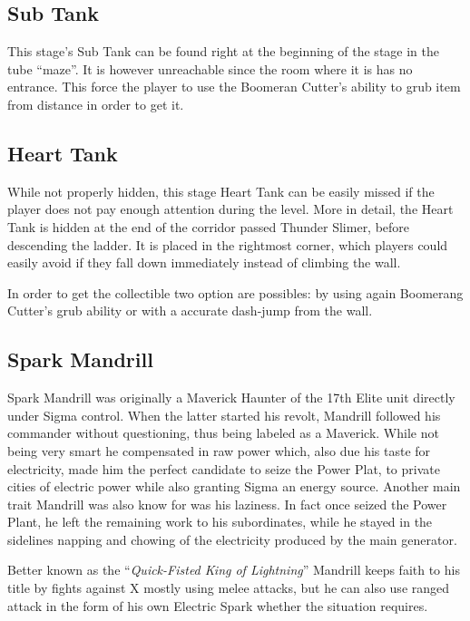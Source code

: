  


\subsection{Sub Tank}
This stage's Sub Tank can be found right at the beginning of the stage in the tube ``maze''. It is however unreachable since the room where it is has no entrance. This force the player to use the Boomeran Cutter's ability to grub item from distance in order to get it.

\subsection{Heart Tank}
While not properly hidden, this stage Heart Tank can be easily missed if the player does not pay enough attention during the level. More in detail, the Heart Tank is hidden at the end of the corridor passed Thunder Slimer, before descending the ladder. It is placed in the rightmost corner, which players could easily avoid if they fall down immediately instead of climbing the wall.

In order to get the collectible two option are possibles: by using again Boomerang Cutter's grub ability or with a accurate dash-jump from the wall.

\subsection{Spark Mandrill}\label{boss:Spark_mandrill}
Spark Mandrill was originally a Maverick Haunter of the 17th Elite unit directly under Sigma control. When the latter started his revolt, Mandrill followed his commander without questioning, thus being labeled as a Maverick. While not being very smart he compensated in raw power\cite{MHX:manual} which, also due his taste for electricity, made him the perfect candidate to seize the Power Plat, to private cities of electric power while also granting Sigma an energy source. Another main trait Mandrill was also know for was his laziness. In fact once seized the Power Plant, he left the remaining work to his subordinates, while he stayed in the sidelines napping and chowing of the electricity produced by the main generator\cite{wayback:X_resources}.

Better known as the ``\textit{Quick-Fisted King of Lightning}'' Mandrill keeps faith to his title by fights against X mostly using melee attacks, but he can also use ranged attack in the form of his own Electric Spark whether the situation requires.

